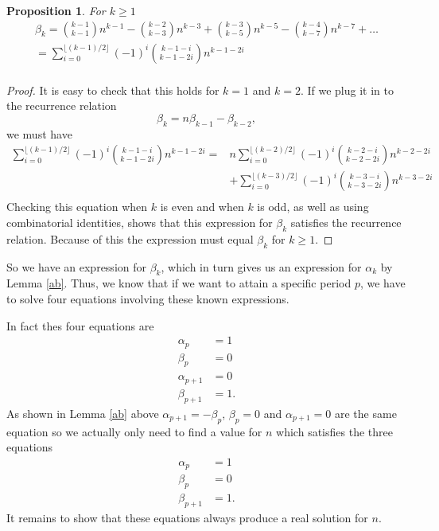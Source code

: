 \documentclass[12pt]{article}
\newtheorem{proposition}{Proposition}
\begin{document}
\begin{proposition} 
For $k \geq 1$
\begin{align*}
\beta_k = \binom{k-1}{k-1} n^{k-1} - \binom{k-2}{k-3}n^{k-3} +\binom{k-3}{k-5}n^{k-5} -\binom{k-4}{k-7}n^{k-7} + \dots \\
=\sum_{i = 0}^{\lfloor (k-1)/2 \rfloor} (-1)^i\binom{k-1-i}{k-1-2i}n^{k-1-2i}\\
\end{align*}
\end{proposition}
\begin{proof}
It is easy to check that this holds for $k = 1$ and $k = 2$.  If we plug it in to the recurrence relation
\begin{equation*}
\beta_k = n\beta_{k-1} - \beta_{k-2},
\end{equation*}
we must have 
\begin{align*}
\sum_{i = 0}^{\lfloor (k-1)/2 \rfloor} (-1)^i\binom{k-1-i}{k-1-2i}n^{k-1-2i} = & n \sum_{i = 0}^{\lfloor (k-2)/2 \rfloor} (-1)^i\binom{k-2-i}{k-2-2i}n^{k-2-2i} \\
& +\sum_{i = 0}^{\lfloor (k-3)/2 \rfloor} (-1)^i\binom{k-3-i}{k-3-2i}n^{k-3-2i}\\
\end{align*}
Checking this equation when $k$ is even and when $k$ is odd, as well as using combinatorial identities, shows that this expression for $\beta_k$ satisfies the recurrence relation. Because of this the expression must equal $\beta_k$ for $k \geq 1$.
\end{proof}

So we have an expression for $\beta_k$, which in turn gives us an expression for $\alpha_k$ by Lemma \ref{ab}. Thus, we know that if we want to attain a specific period $p$, we have to solve four equations involving these known expressions.

In fact thes four equations are 
\begin{align*}
\alpha_p &=1 \\
\beta_p &=0\\ 
\alpha_{p+1} &= 0 \\
\beta_{p+1} &= 1.
\end{align*}
As shown in Lemma \ref{ab} above $\alpha_{p+1} = -\beta_p$,  $\beta_p=0$ and $\alpha_{p+1} =0$ are the same equation so we actually only need to find a value for $n$ which satisfies the three equations
\begin{align*}
\alpha_p &=1 \\
\beta_p &=0\\ 
\beta_{p+1} &= 1.
\end{align*}
It remains to show that these equations always produce a real solution for $n$.
\\ 
\end{document}
